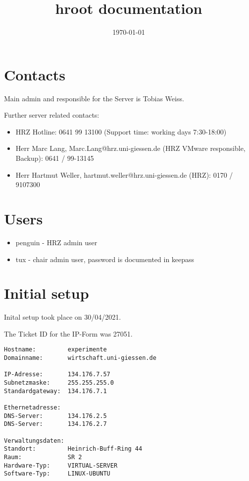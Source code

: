 \documentclass{article}
\title{hroot documentation}
\date{\today}
\begin{document}
\tableofcontents

\maketitle

\section{Contacts}
Main admin and responsible for the Server is Tobias Weiss.

Further server related contacts:
\begin{itemize}
    \item HRZ Hotline: 0641 99 13100 (Support time: working days 7:30-18:00)
    \item Herr Marc Lang, Marc.Lang@hrz.uni-giessen.de (HRZ VMware responsible, Backup): 0641 / 99-13145
    \item Herr Hartmut Weller, hartmut.weller@hrz.uni-giessen.de (HRZ): 0170 / 9107300
\end{itemize}

\section{Users}
\begin{itemize}
    \item penguin - HRZ admin user
    \item tux - chair admin user, password is documented in keepass
\end{itemize}

\section{Initial setup}
Inital setup took place on 30/04/2021.

The Ticket ID for the IP-Form was 27051.

\begin{lstlisting}
Hostname:         experimente
Domainname:       wirtschaft.uni-giessen.de

IP-Adresse:       134.176.7.57
Subnetzmaske:     255.255.255.0
Standardgateway:  134.176.7.1

Ethernetadresse:
DNS-Server:       134.176.2.5
DNS-Server:       134.176.2.7

Verwaltungsdaten:
Standort:         Heinrich-Buff-Ring 44
Raum:             SR 2
Hardware-Typ:     VIRTUAL-SERVER
Software-Typ:     LINUX-UBUNTU
\end{lstlisting}
\end{document}
